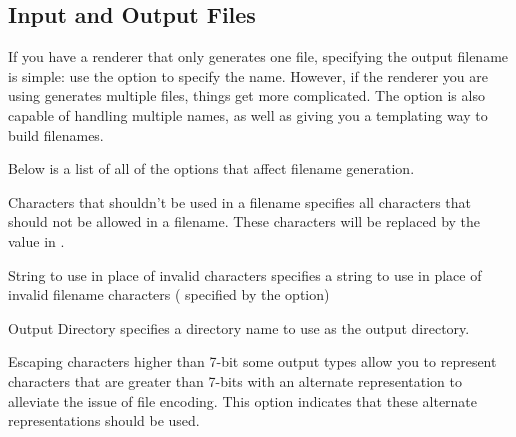 \subsection{Input and Output Files\label{sec:config-files}}

If you have a renderer that only generates one file, specifying the output
filename is simple: use the  option to specify
the name.  However, if the renderer you are using generates multiple
files, things get more complicated.  The  option
is also capable of handling multiple names, as well as giving you a
templating way to build filenames.

Below is a list of all of the options that affect filename generation.

\begin{configuration}{Characters that shouldn't be used in a filename}
specifies all characters that should not be allowed in a filename.
These characters will be replaced by the value in
.
\end{configuration}

\begin{configuration}{String to use in place of invalid characters}
specifies a string to use in place of invalid filename characters (
specified by the  option)
\end{configuration}

\begin{configuration}{Output Directory}
specifies a directory name to use as the output directory.
\end{configuration}

\begin{configuration}{Escaping characters higher than 7-bit}
some output types allow you to represent characters that are greater than
7-bits with an alternate representation to alleviate the issue of
file encoding.  This option indicates that these alternate representations
should be used.

\end{configuration}

